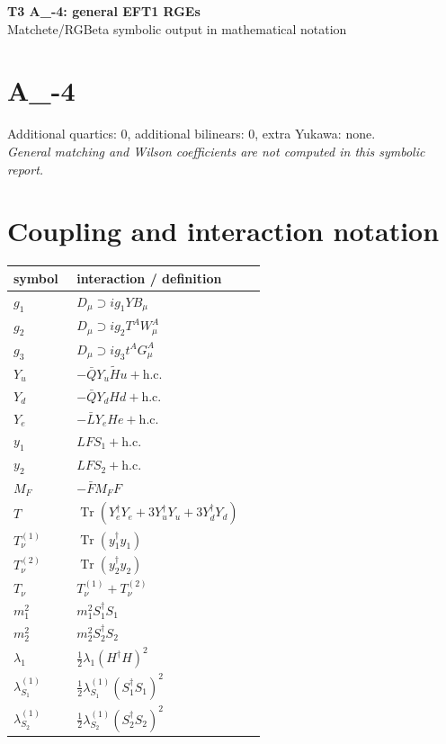 \documentclass[10pt,a4paper]{article}
\begin{document}
\begin{center}
{\Large\bfseries T3 A\_-4: general EFT1 RGEs}\\[4pt]
Matchete/RGBeta symbolic output in mathematical notation
\end{center}
\bigskip
\section*{A\_-4}
Additional quartics: 0, additional bilinears: 0, extra Yukawa: none.\\
\emph{General matching and Wilson coefficients are not computed in this symbolic report.}
\section*{Coupling and interaction notation}
\begin{longtable}{@{}p{0.23\linewidth}p{0.69\linewidth}@{}}
\toprule
symbol & interaction / definition \\
\midrule
$g_1$ & $D_\mu\supset i g_1YB_\mu$ \\
$g_2$ & $D_\mu\supset i g_2T^AW_\mu^A$ \\
$g_3$ & $D_\mu\supset i g_3t^AG_\mu^A$ \\
$Y_u$ & $-\bar QY_u\widetilde Hu+\mathrm{h.c.}$ \\
$Y_d$ & $-\bar QY_dHd+\mathrm{h.c.}$ \\
$Y_e$ & $-\bar LY_eHe+\mathrm{h.c.}$ \\
$y_1$ & $LFS_1+\mathrm{h.c.}$ \\
$y_2$ & $LFS_2+\mathrm{h.c.}$ \\
$M_F$ & $-\bar FM_FF$ \\
$T$ & $\operatorname{Tr}(Y_e^\dagger Y_e+3Y_u^\dagger Y_u+3Y_d^\dagger Y_d)$ \\
$T_\nu^{(1)}$ & $\operatorname{Tr}(y_1^\dagger y_1)$ \\
$T_\nu^{(2)}$ & $\operatorname{Tr}(y_2^\dagger y_2)$ \\
$T_\nu$ & $T_\nu^{(1)}+T_\nu^{(2)}$ \\
$m_1^2$ & $m_1^2S_1^\dagger S_1$ \\
$m_2^2$ & $m_2^2S_2^\dagger S_2$ \\
$\lambda_1$ & $\frac12\lambda_1(H^\dagger H)^2$ \\
$\lambda_{S_1}^{(1)}$ & $\frac12\lambda_{S_1}^{(1)}(S_1^\dagger S_1)^2$ \\
$\lambda_{S_2}^{(1)}$ & $\frac12\lambda_{S_2}^{(1)}(S_2^\dagger S_2)^2$ \\

\end{longtable}
\end{document}
